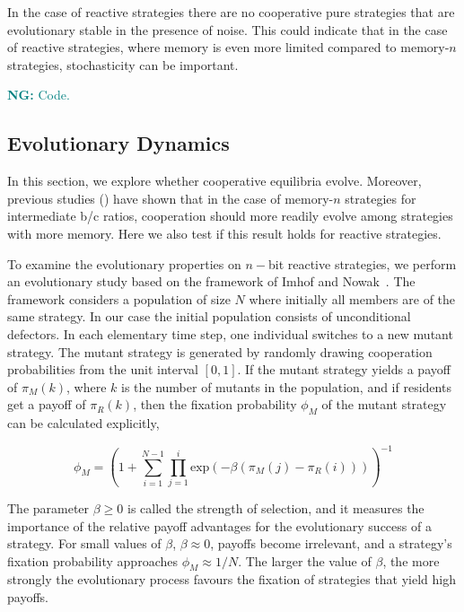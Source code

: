 \documentclass{article}
\theoremstyle{definition}
\newcommand{\nikoleta}[1]{\textcolor{teal}{{\bf NG:} #1}}
\begin{document}
In the case of reactive strategies there are no cooperative pure
strategies that are evolutionary stable in the presence of noise. This could
indicate that in the case of reactive strategies, where memory is even more
limited compared to memory-\(n\) strategies, stochasticity can be important.

\nikoleta{Code.}

\subsection{Evolutionary Dynamics}\label{section:evolutionary_simulations}

In this section, we explore whether cooperative equilibria evolve. Moreover,
previous studies (\citep{hilbe:PNAS:2017}) have shown that in the case of
memory-\(n\) strategies for intermediate b/c ratios, cooperation should more
readily evolve among strategies with more memory. Here we also test if this
result holds for reactive strategies.

To examine the evolutionary properties on \(n-\)bit reactive strategies, we
perform an evolutionary study based on the framework of Imhof and
Nowak~\citep{imhof:royal:2010}. The framework considers a population of size
\(N\) where initially all members are of the same strategy. In our case the
initial population consists of unconditional defectors. In each elementary time
step, one individual switches to a new mutant strategy. The mutant strategy is
generated by randomly drawing cooperation probabilities from the unit interval
\([0,1]\). If the mutant strategy yields a payoff of \(\pi_{M}(k)\), where \(k\)
is the number of mutants in the population, and if residents get a payoff of
\(\pi_{R}(k)\), then the fixation probability \(\phi_{M}\) of the mutant
strategy can be calculated explicitly,

\begin{equation}\label{eq:fixation_probability}
  \phi_{M} = \left(1 + \sum_{i=1}^{N - 1} \prod_{j=1}^{i} \text{exp} (- \beta (\pi_{M}(j) - \pi_{R}(i))) \right)^{-1}
\end{equation}

The parameter \(\beta \geq 0\) is called the strength of selection, and it
measures the importance of the relative payoff advantages for the
evolutionary success of a strategy. For small values of \(\beta\), \(\beta
\approx 0\), payoffs become irrelevant, and a strategy's fixation probability
approaches \(\phi_{M} \approx 1 / N\). The larger the value of \(\beta\), the
more strongly the evolutionary process favours the fixation of strategies that
yield high payoffs.
\end{document}
